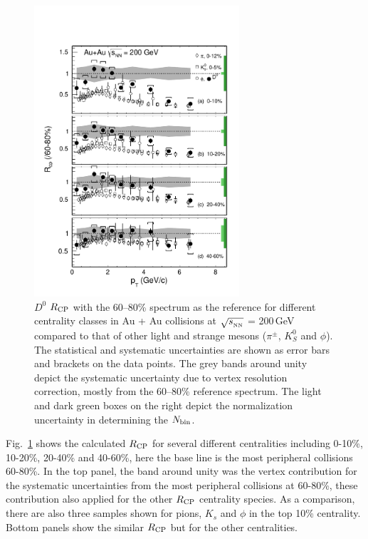 \begin{figure}
\centering
\includegraphics[width=0.68\textwidth]{figure/Run14_D0HFT/D0_Rcp1.pdf}
\caption{$D^{0}$ $R_{\rm CP}$ with the 60--80\% spectrum as the reference for different centrality classes in Au + Au collisions at $\sqrt{s_{_{\rm NN}}}$ = 200\,GeV compared to that of other light and strange mesons ($\pi^{\pm}$, $K^0_{S}$ and $\phi$). The statistical and systematic uncertainties are shown as error bars and brackets on the data points. The grey bands around unity depict the systematic uncertainty due to vertex resolution correction, mostly from the 60--80\% reference spectrum. The light and dark green boxes on the right depict the normalization uncertainty in determining the $N_{\rm bin}$.}
\label{D0_Rcp} 
\end{figure}

Fig.~\ref{D0_Rcp} shows the calculated $R_{\rm CP}$ for several different centralities including 0-10\%, 10-20\%, 20-40\% and 40-60\%, here the base line is the most peripheral collisions 60-80\%. In the top panel, the band around unity was the vertex contribution for the systematic uncertainties from the most peripheral collisions at 60-80\%, these contribution also applied for the other $R_{\rm CP}$ centrality species. As a comparison, there are also three samples shown for pions, $K_{s}$ and $\phi$ in the top 10\% centrality. Bottom panels show the similar $R_{\rm CP}$ but for the other centralities.

